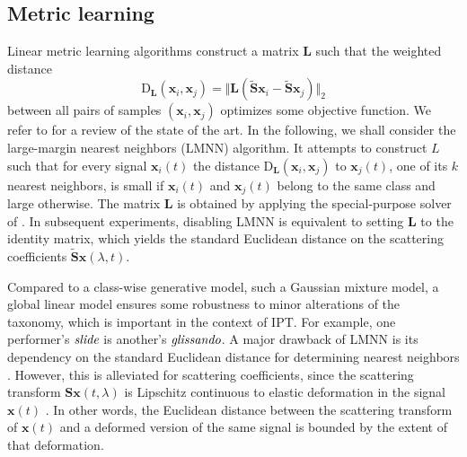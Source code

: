 \subsection{Metric learning} %
Linear metric learning algorithms construct a matrix $\mathbf{L}$ such that the weighted distance
\begin{equation}
\mathrm{D}_\mathbf{L}(\boldsymbol{x}_i, \boldsymbol{x}_j) = \Vert \mathbf{L} (\widetilde{\mathbf{S}}\boldsymbol{x}_i-\widetilde{\mathbf{S}}\boldsymbol{x}_j) \Vert_2
\end{equation}
between all pairs of samples $(\boldsymbol{x}_i, \boldsymbol{x}_j)$ optimizes some objective function.
We refer to \cite{bellet2013survey} for a review of the state of the art.
In the following, we shall consider the large-margin nearest neighbors (LMNN) algorithm.
It attempts to construct $L$ such that for every signal $\boldsymbol{x}_i (t)$ the distance $\mathrm{D}_\mathbf{L}(\boldsymbol{x}_i, \boldsymbol{x}_j)$ to $\boldsymbol{x}_j (t)$, one of its $k$ nearest neighbors, is small if $\boldsymbol{x}_i (t)$ and $\boldsymbol{x}_j (t)$ belong to the same class and large otherwise.
The matrix $\mathbf{L}$ is obtained by applying the special-purpose solver of \cite[appendix A]{weinberger2009jmlr}.
In subsequent experiments, disabling LMNN is equivalent to setting $\mathbf{L}$ to the identity matrix, which yields the standard Euclidean distance on the scattering coefficients $\widetilde{\mathbf{S}} \boldsymbol{x} (\lambda, t)$.

Compared to a class-wise generative model, such a Gaussian mixture model, a global linear model ensures some robustness to minor alterations of the taxonomy, which is important in the context of IPT.
For example, one performer's $\emph{slide}$ is another's $\emph{glissando}$.
A major drawback of LMNN is its dependency on the standard Euclidean distance for determining nearest neighbors \cite{mcfee2010icml}.
However, this is alleviated for scattering coefficients, since the scattering transform $\mathbf{S} \boldsymbol{x} (t, \lambda)$ is Lipschitz continuous to elastic deformation in the signal $\boldsymbol{x} (t)$ \cite[Theorem 2.16]{mallat2012cpam}.
In other words, the Euclidean distance between the scattering transform of $\boldsymbol{x} (t)$ and a deformed version of the same signal is bounded by the extent of that deformation.




